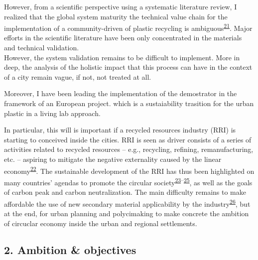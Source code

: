 \documentclass[
  11pt,
  a4paperpaper,
  onecolumn]{article}
\begin{document}
However, from a scientific perspective using a systematic literature
review, I realized that the global system maturity the technical value
chain for the implementation of a community-driven of plastic recycling
is
ambiguous\textsuperscript{\protect\hyperlink{ref-CruzSanchez2020}{21}}.
Major efforts in the scientific literature have been only concentrated
in the materials and technical validation.\\
However, the system validation remains to be difficult to implement.
More in deep, the analysis of the holistic impact that this process can
have in the context of a city remain vague, if not, not treated at all.

Moreover, I have been leading the implementation of the demostrator in
the framework of an European project. which is a sustaiability trasition
for the urban plastic in a living lab approach.

In particular, this will is important if a recycled resources industry
(RRI) is starting to conceived inside the cities. RRI is seen as driver
consists of a series of activities related to recycled resources --
e.g., recycling, refining, remanufacturing, etc. -- aspiring to mitigate
the negative externality caused by the linear
economy\textsuperscript{\protect\hyperlink{ref-wang2019b}{22}}. The
sustainable development of the RRI has thus been highlighted on many
countries' agendas to promote the circular
society\textsuperscript{\protect\hyperlink{ref-leipold2021}{23}--\protect\hyperlink{ref-jaeger-erben2021a}{25}},
as well as the goals of carbon peak and carbon neutralization. The main
difficulty remains to make affordable the use of new secondary material
applicability by the
industry\textsuperscript{\protect\hyperlink{ref-klotz2022}{26}}, but at
the end, for urban planning and polycimaking to make concrete the
ambition of circuclar economy inside the urban and regional settlements.

\hypertarget{ambition-objectives}{%
\subsection{2. Ambition \& objectives}\label{ambition-objectives}}
\end{document}

